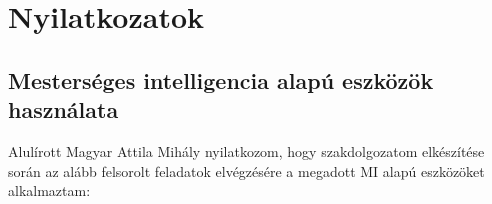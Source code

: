 \documentclass[UTF8,noindent,nohyp,parspace,titlepage,a4paper,12pt]{article}
\begin{document}
\clearpage

  \nocite{*}
  \printbibliography[heading=bibintoc]

\clearpage

  \section*{Nyilatkozatok}

    \subsection*{Mesterséges intelligencia alapú eszközök használata}

      Alulírott Magyar Attila Mihály nyilatkozom, hogy szakdolgozatom
      elkészítése során az alább felsorolt feladatok elvégzésére a megadott
      MI alapú eszközöket alkalmaztam:
\end{document}
